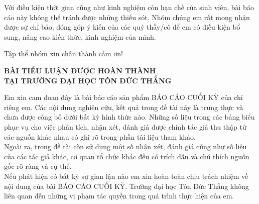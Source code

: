 \documentclass[12pt,a4paper,2sides]{report}
\newcommand{\bai}{BÁO CÁO CUỐI KỲ}
\begin{document}
Với điều kiện thời gian cũng như kinh nghiệm còn hạn chế của sinh viên, bài báo cáo này không thể tránh được những thiếu sót. Nhóm chúng em rất mong nhận được sự chỉ bảo, đóng góp ý kiến của các quý thầy/cô để em có điều kiện bổ sung, nâng cao kiến thức, kinh nghiệm của mình.

\hspace{8cm}Tập thể nhóm xin chân thành cảm ơn!

	\newpage
\begin{center}
	\Large{\textbf{BÀI TIỂU LUẬN ĐƯỢC HOÀN THÀNH}} \\
	\Large{\textbf{TẠI TRƯỜNG ĐẠI HỌC TÔN ĐỨC THẮNG}} \\
\end{center}	

Em xin cam đoan đây là bài báo cáo sản phẩm \bai \mbox{} của chỉ riêng em. Các nội dung nghiên cứu, kết quả trong đề tài này là trung thực và chưa được công bố dưới bất kỳ hình thức nào. Những số liệu trong các bảng biểu phục vụ cho việc phân tích, nhận xét, đánh giá được chính tác giả thu thập từ các nguồn khác nhau có ghi rõ trong phần tài liệu tham khảo.\\

Ngoài ra, trong đề tài còn sử dụng một số nhận xét, đánh giá cũng như số liệu của các tác giả khác, cơ quan tổ chức khác đều có trích dẫn và chú thích nguồn gốc rõ ràng và cụ thể.\\

Nếu phát hiện có bất kỳ sự gian lận nào em xin hoàn toàn chịu trách nhiệm về nội dung của bài \bai. Trường đại học Tôn Đức Thắng không liên quan đến những vi phạm tác quyền trong quá trình thực hiện của em.\\
\end{document}
